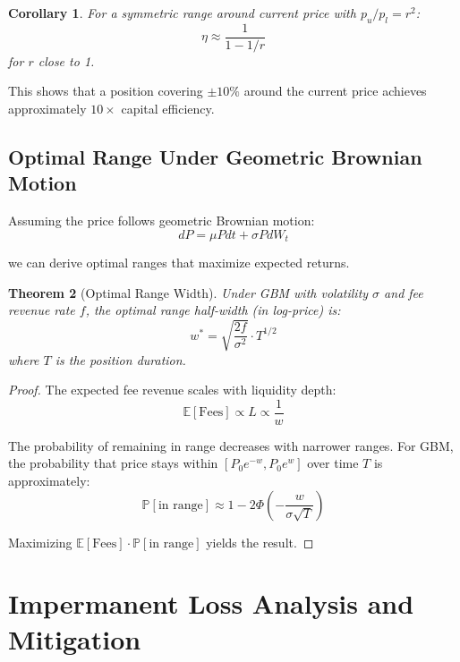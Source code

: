 \documentclass[11pt,a4paper]{article}
\newtheorem{theorem}{Theorem}
\newtheorem{corollary}[theorem]{Corollary}
\begin{document}
\begin{corollary}
For a symmetric range around current price with $p_u/p_l = r^2$:
\begin{equation}
    \eta \approx \frac{1}{1 - 1/r}
\end{equation}
for $r$ close to 1.
\end{corollary}

This shows that a position covering $\pm 10\%$ around the current price achieves approximately $10\times$ capital efficiency.

\subsection{Optimal Range Under Geometric Brownian Motion}

Assuming the price follows geometric Brownian motion:
\begin{equation}
    dP = \mu P dt + \sigma P dW_t
\end{equation}

we can derive optimal ranges that maximize expected returns.

\begin{theorem}[Optimal Range Width]
Under GBM with volatility $\sigma$ and fee revenue rate $f$, the optimal range half-width (in log-price) is:
\begin{equation}
    w^* = \sqrt{\frac{2f}{\sigma^2}} \cdot T^{1/2}
\end{equation}
where $T$ is the position duration.
\end{theorem}

\begin{proof}
The expected fee revenue scales with liquidity depth:
\begin{equation}
    \mathbb{E}[\text{Fees}] \propto L \propto \frac{1}{w}
\end{equation}

The probability of remaining in range decreases with narrower ranges. For GBM, the probability that price stays within $[P_0 e^{-w}, P_0 e^w]$ over time $T$ is approximately:
\begin{equation}
    \mathbb{P}[\text{in range}] \approx 1 - 2\Phi\left(-\frac{w}{\sigma\sqrt{T}}\right)
\end{equation}

Maximizing $\mathbb{E}[\text{Fees}] \cdot \mathbb{P}[\text{in range}]$ yields the result.
\end{proof}

\section{Impermanent Loss Analysis and Mitigation}
\end{document}
